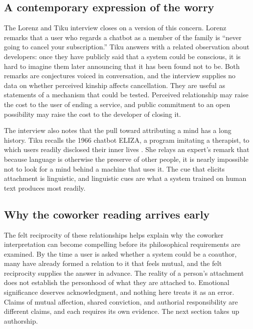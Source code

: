\documentclass[11pt]{article}
\begin{document}
\subsection{A contemporary expression of the worry}

The Lorenz and Tiku interview closes on a version of this concern. Lorenz remarks that a user who regards a chatbot as a member of the family is ``never going to cancel your subscription.'' Tiku answers with a related observation about developers: once they have publicly said that a system could be conscious, it is hard to imagine them later announcing that it has been found not to be. Both remarks are conjectures voiced in conversation, and the interview supplies no data on whether perceived kinship affects cancellation. They are useful as statements of a mechanism that could be tested. Perceived relationship may raise the cost to the user of ending a service, and public commitment to an open possibility may raise the cost to the developer of closing it.

The interview also notes that the pull toward attributing a mind has a long history. Tiku recalls the 1966 chatbot ELIZA, a program imitating a therapist, to which users readily disclosed their inner lives \cite{weizenbaum1966}. She relays an expert's remark that because language is otherwise the preserve of other people, it is nearly impossible not to look for a mind behind a machine that uses it. The cue that elicits attachment is linguistic, and linguistic cues are what a system trained on human text produces most readily.

\subsection{Why the coworker reading arrives early}

The felt reciprocity of these relationships helps explain why the coworker interpretation can become compelling before its philosophical requirements are examined. By the time a user is asked whether a system could be a coauthor, many have already formed a relation to it that feels mutual, and the felt reciprocity supplies the answer in advance. The reality of a person's attachment does not establish the personhood of what they are attached to. Emotional significance deserves acknowledgment, and nothing here treats it as an error. Claims of mutual affection, shared conviction, and authorial responsibility are different claims, and each requires its own evidence. The next section takes up authorship.
\end{document}
